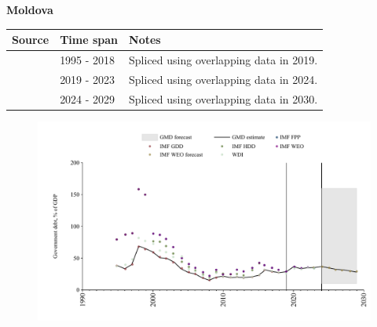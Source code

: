 \documentclass[12pt,a4paper,landscape]{article}
\begin{document}
\begin{adjustbox}{max totalsize={\paperwidth}{\paperheight},center}
\begin{minipage}[t][\textheight][t]{\textwidth}
\vspace*{0.5cm}
{}
\begin{center}
{\Large\bfseries Moldova}
\end{center}
\vspace{0.5cm}
\begin{table}[H]
\centering
\small
\begin{tabular}{|l|l|l|}
\hline
\textbf{Source} & \textbf{Time span} & \textbf{Notes} \\
\hline
\rowcolor{white}\cite{IMF_GDD}& 1995 - 2018 &Spliced using overlapping data in 2019.\\
\rowcolor{lightgray}\cite{IMF_FPP}& 2019 - 2023 &Spliced using overlapping data in 2024.\\
\rowcolor{white}\cite{IMF_WEO_forecast}& 2024 - 2029 &Spliced using overlapping data in 2030.\\
\hline
\end{tabular}
\end{table}
\begin{figure}[H]
\centering
\includegraphics[width=\textwidth,height=0.6\textheight,keepaspectratio]{graphs/MDA_govdebt_GDP.pdf}
\end{figure}
\end{minipage}
\end{adjustbox}
\end{document}
